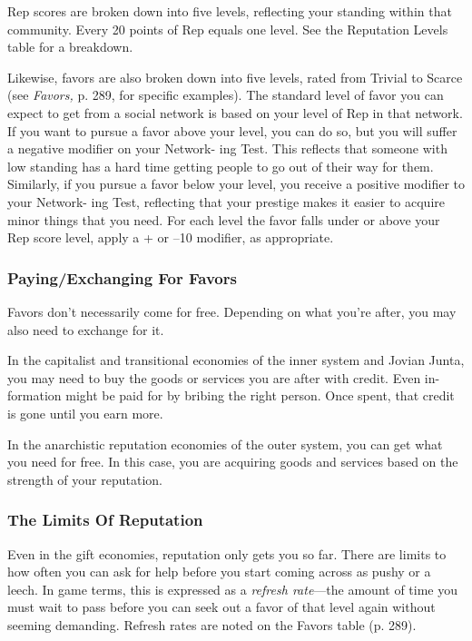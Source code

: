 Rep scores are broken down into five levels, reflecting 
your standing within that community. Every 20 points 
of Rep equals one level. See the Reputation Levels 
table for a breakdown.

Likewise, favors are also broken down into five 
levels, rated from Trivial to Scarce (see \textit{Favors,} p. 289, 
for specific examples). The standard level of favor 
you can expect to get from a social network is based 
on your level of Rep in that network. If you want to 
pursue a favor above your level, you can do so, but 
you will suffer a negative modifier on your Network-
ing Test. This reflects that someone with low standing 
has a hard time getting people to go out of their way 
for them. Similarly, if you pursue a favor below your 
level, you receive a positive modifier to your Network-
ing Test, reflecting that your prestige makes it easier to 
acquire minor things that you need. For each level the 
favor falls under or above your Rep score level, apply 
a + or –10 modifier, as appropriate.

\subsubsection{Paying/Exchanging For Favors}

Favors don't necessarily come for free. Depending on 
what you're after, you may also need to exchange for it.

In the capitalist and transitional economies of the 
inner system and Jovian Junta, you may need to buy 
the goods or services you are after with credit. Even in-
formation might be paid for by bribing the right person. 
Once spent, that credit is gone until you earn more.

In the anarchistic reputation economies of the outer 
system, you can get what you need for free. In this 
case, you are acquiring goods and services based on 
the strength of your reputation.

\subsubsection{The Limits Of Reputation}

Even in the gift economies, reputation only gets you so 
far. There are limits to how often you can ask for help 
before you start coming across as pushy or a leech. In 
game terms, this is expressed as a \textit{refresh rate}—the 
amount of time you must wait to pass before you can 
seek out a favor of that level again without seeming 
demanding. Refresh rates are noted on the Favors 
table (p. 289).

